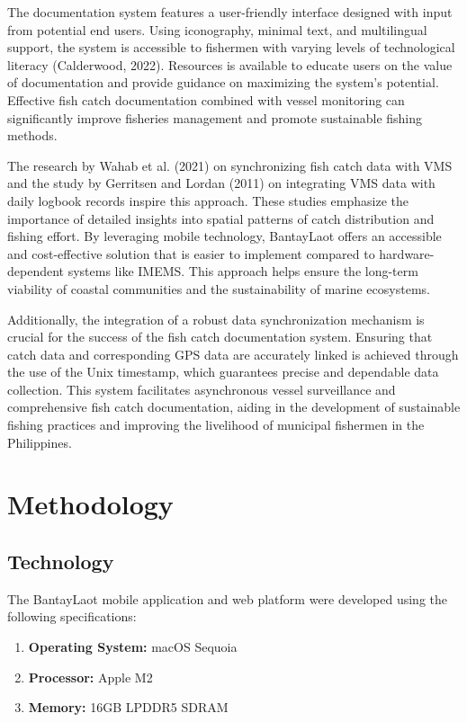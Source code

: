 \documentclass[journal]{IEEEtran}
\begin{document}
The documentation system features a user-friendly interface designed with input from potential end users. Using iconography, minimal text, and multilingual support, the system is accessible to fishermen with varying levels of technological literacy (Calderwood, 2022). Resources is available to educate users on the value of documentation and provide guidance on maximizing the system's potential. Effective fish catch documentation combined with vessel monitoring can significantly improve fisheries management and promote sustainable fishing methods.

The research by Wahab et al. (2021) on synchronizing fish catch data with VMS and the study by Gerritsen and Lordan (2011) on integrating VMS data with daily logbook records inspire this approach. These studies emphasize the importance of detailed insights into spatial patterns of catch distribution and fishing effort. By leveraging mobile technology, BantayLaot offers an accessible and cost-effective solution that is easier to implement compared to hardware-dependent systems like IMEMS. This approach helps ensure the long-term viability of coastal communities and the sustainability of marine ecosystems.

Additionally, the integration of a robust data synchronization mechanism is crucial for the success of the fish catch documentation system. Ensuring that catch data and corresponding GPS data are accurately linked is achieved through the use of the Unix timestamp, which guarantees precise and dependable data collection. This system facilitates asynchronous vessel surveillance and comprehensive fish catch documentation, aiding in the development of sustainable fishing practices and improving the livelihood of municipal fishermen in the Philippines.

\section{Methodology}

\subsection{Technology}
The BantayLaot mobile application and web platform were developed using the following specifications:
\begin{enumerate}
    \item \textbf{Operating System:} macOS Sequoia
    \item \textbf{Processor:} Apple M2
    \item \textbf{Memory:} 16GB LPDDR5 SDRAM
\end{enumerate}
\end{document}
